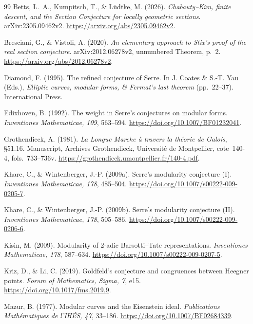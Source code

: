 \documentclass[11pt,a4paper]{article}
\theoremstyle{plain}
\theoremstyle{definition}
\begin{document}
\begin{thebibliography}{99}
Betts, L.~A., Kumpitsch, T., \& L\"udtke, M. (2026).
\emph{Chabauty--Kim, finite descent, and the Section Conjecture for locally
geometric sections}. arXiv:2305.09462v2.
\url{https://arxiv.org/abs/2305.09462v2}.

Bresciani, G., \& Vistoli, A. (2020).
\emph{An elementary approach to Stix's proof of the real section conjecture}.
arXiv:2012.06278v2, unnumbered Theorem, p.~2.
\url{https://arxiv.org/abs/2012.06278v2}.

Diamond, F. (1995). The refined conjecture of Serre.
In J. Coates \& S.-T. Yau (Eds.),
\emph{Elliptic curves, modular forms, \& Fermat's last theorem}
(pp.~22--37). International Press.

Edixhoven, B. (1992). The weight in Serre's conjectures on modular forms.
\emph{Inventiones Mathematicae, 109}, 563--594.
\url{https://doi.org/10.1007/BF01232041}.

Grothendieck, A. (1981). \emph{La Longue Marche \`a travers la th\'eorie
de Galois}, \S51.16. Manuscript, Archives Grothendieck, Universit\'e de
Montpellier, cote~140-4, fols.~733--736v.
\url{https://grothendieck.umontpellier.fr/140-4.pdf}.

Khare, C., \& Wintenberger, J.-P. (2009a).
Serre's modularity conjecture (I).
\emph{Inventiones Mathematicae, 178}, 485--504.
\url{https://doi.org/10.1007/s00222-009-0205-7}.

Khare, C., \& Wintenberger, J.-P. (2009b).
Serre's modularity conjecture (II).
\emph{Inventiones Mathematicae, 178}, 505--586.
\url{https://doi.org/10.1007/s00222-009-0206-6}.

Kisin, M. (2009). Modularity of 2-adic Barsotti--Tate representations.
\emph{Inventiones Mathematicae, 178}, 587--634.
\url{https://doi.org/10.1007/s00222-009-0207-5}.

Kriz, D., \& Li, C. (2019). Goldfeld's conjecture and congruences between
Heegner points. \emph{Forum of Mathematics, Sigma, 7}, e15.
\url{https://doi.org/10.1017/fms.2019.9}.

Mazur, B. (1977). Modular curves and the Eisenstein ideal.
\emph{Publications Math\'ematiques de l'IH\'ES, 47}, 33--186.
\url{https://doi.org/10.1007/BF02684339}.


\end{thebibliography}
\end{document}
